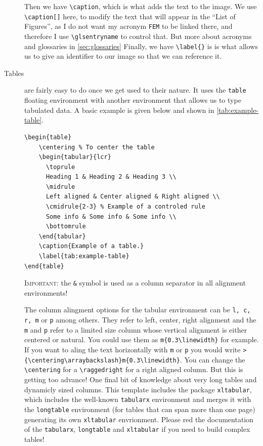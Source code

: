 \begin{description}
	Then we have \verb|\caption|, which is what adds the text to the image. We use \verb|\caption[]| here, to modify the text that will appear in the ``List of Figures'', as I do not want my acronym \texttt{FEM} to be linked there, and therefore I use \verb|\glsentryname| to control that. But more about acronyms and glossaries in \cref{sec:glossaries}
	Finally, we have \verb|\label{}| is is what allows us to give an identifier to our image so that we can reference it.
		\item[Tables] are fairly easy to do once we get used to their nature. It uses the \verb|table| floating environment with another environment that allows us to type tabulated data. A basic example is given below and shown in \cref{tab:example-table}.
\begin{lstlisting}[language={[LaTeX]TeX}]
\begin{table}
	\centering % To center the table
	\begin{tabular}{lcr}
	  \toprule
	  Heading 1 & Heading 2 & Heading 3 \\
	  \midrule
	  Left aligned & Center aligned & Right aligned \\
	  \cmidrule{2-3} % Example of a controled rule
	  Some info & Some info & Some info \\
	  \bottomrule
	\end{tabular}
	\caption{Example of a table.}
	\label{tab:example-table}
\end{table}
\end{lstlisting}
	\textsc{\color{red}Important:} the \texttt{\&} symbol is used as a column separator in all alignment environments!

	The column alingment options for the tabular environment can be \texttt{l, c, r, m{}} or \texttt{p{}} among others. They refer to left, center, right alignment and the \texttt{m{}} and \texttt{p{}} refer to a limited size column whose vertical alignment is either centered or natural. You could use them as \verb|m{0.3\linewidth}| for example. If you want to aling the text horizontally with \texttt{m} or \texttt{p} you would write \verb|>{\centering\arraybackslash}m{0.3\linewidth}|. You can change the \verb|\centering| for a \verb|\raggedright| for a right aligned column. But this is getting too advance!
	One final bit of knowledge about very long tables and dynamicly sized columns. This template includes the package \texttt{xltabular}, which includes the well-known \verb|tabularx| environment and merges it with the \verb|longtable| environment (for tables that can span more than one page) generating its own \verb|xltabular| envrionment. Please red the documentation of the \texttt{tabularx}, \verb|longtable| and \verb|xltabular| if you need to build complex tables!


\end{description}
